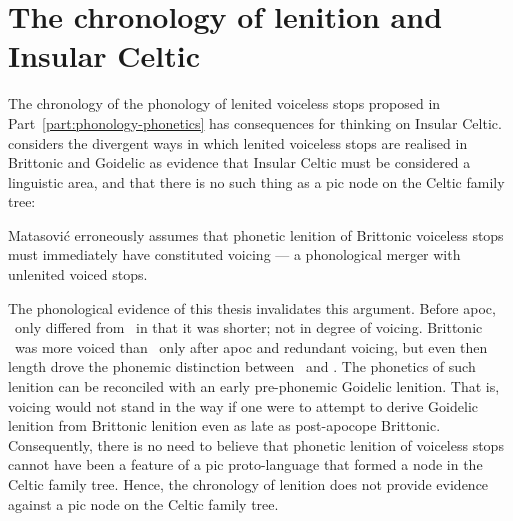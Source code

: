 \section{The chronology of lenition and Insular Celtic}
\label{sec:cons-other-rese-1}
The chronology of the phonology of lenited voiceless stops proposed in Part~\ref{part:phonology-phonetics} has consequences for thinking on Insular Celtic. \Textcite{matasovic_insular_2008} considers the divergent ways in which lenited voiceless stops are realised in Brittonic and Goidelic as evidence that Insular Celtic must be considered  a linguistic area, and that there is no such thing as a \gls{pic} node on the Celtic family tree:

Matasović erroneously assumes that phonetic lenition of Brittonic  voiceless stops must immediately have constituted voicing --- a phonological merger with unlenited voiced stops.

The phonological evidence of this thesis invalidates this argument. Before \gls{apoc}, \lT\ only differed from \xT\ in that it was shorter; not in degree of voicing. Brittonic    \lT\ was more voiced than \xT\ only after \gls{apoc} and redundant voicing, but even then length drove the phonemic distinction between \xT\ and \lT. The phonetics of such lenition can be reconciled with an early pre-phonemic Goidelic lenition. That is, voicing would not stand in the way if one were to attempt to derive Goidelic lenition from Brittonic lenition even as late as post-apocope Brittonic. Consequently, there is no need to believe  that phonetic lenition of voiceless stops cannot have been a feature of a \gls{pic} proto-language that formed a node in the Celtic family tree. Hence, the chronology of lenition does not provide evidence against a \gls{pic} node on the Celtic family tree.

